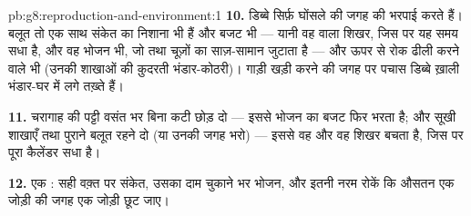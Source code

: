\begin{solution}{pb:g8:reproduction-and-environment:1}
\textbf{10.} डिब्बे सिर्फ़ घोंसले की जगह की भरपाई करते हैं। बलूत तो एक
साथ संकेत का निशाना भी हैं और बजट भी --- यानी वह  वाला शिखर,
जिस पर यह समय सधा है, और वह भोजन भी, जो  तथा चूज़ों का साज़-सामान
जुटाता है --- और ऊपर से रोक ढीली करने वाले भी (उनकी शाखाओं की क़ुदरती
भंडार-कोठरी)। गाड़ी खड़ी करने की जगह पर पचास डिब्बे ख़ाली भंडार-घर में
लगे तख़्ते हैं।

\textbf{11.} चरागाह की पट्टी वसंत भर बिना कटी छोड़ दो --- इससे भोजन का
बजट फिर भरता है; और सूखी शाखाएँ तथा पुराने बलूत रहने दो (या उनकी जगह
भरो) --- इससे वह  और वह शिखर बचता है, जिस पर पूरा कैलेंडर सधा है।

\textbf{12.} एक : सही वक़्त पर संकेत, उसका दाम चुकाने भर भोजन, और
इतनी नरम रोकें कि औसतन एक जोड़ी की जगह एक जोड़ी छूट जाए।
\end{solution}
